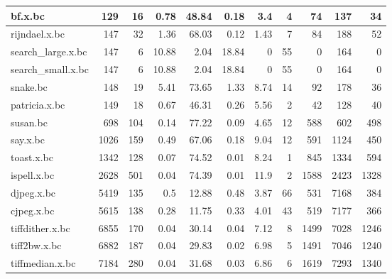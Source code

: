 \begin{tabular}{|l|r|r|r|r|r|r|r|r|r|r|}
\hline
 bf.x.bc              &      129 &   16 &   0.78 &    48.84 &   0.18 &     3.4  &     4 &      74 &        137 &        34 \\
\hline
 rijndael.x.bc        &      147 &   32 &   1.36 &    68.03 &   0.12 &     1.43 &     7 &      84 &        188 &        52 \\
\hline
 search\_large.x.bc    &      147 &    6 &  10.88 &     2.04 &  18.84 &     0    &    55 &       0 &        164 &         0 \\
\hline
 search\_small.x.bc    &      147 &    6 &  10.88 &     2.04 &  18.84 &     0    &    55 &       0 &        164 &         0 \\
\hline
 snake.bc             &      148 &   19 &   5.41 &    73.65 &   1.33 &     8.74 &    14 &      92 &        178 &        36 \\
\hline
 patricia.x.bc        &      149 &   18 &   0.67 &    46.31 &   0.26 &     5.56 &     2 &      42 &        128 &        40 \\
\hline
 susan.bc             &      698 &  104 &   0.14 &    77.22 &   0.09 &     4.65 &    12 &     588 &        602 &       498 \\
\hline
 say.x.bc             &     1026 &  159 &   0.49 &    67.06 &   0.18 &     9.04 &    12 &     591 &       1124 &       450 \\
\hline
 toast.x.bc           &     1342 &  128 &   0.07 &    74.52 &   0.01 &     8.24 &     1 &     845 &       1334 &       594 \\
\hline
 ispell.x.bc          &     2628 &  501 &   0.04 &    74.39 &   0.01 &    11.9  &     2 &    1588 &       2423 &      1328 \\
\hline
 djpeg.x.bc           &     5419 &  135 &   0.5  &    12.88 &   0.48 &     3.87 &    66 &     531 &       7168 &       384 \\
\hline
 cjpeg.x.bc           &     5615 &  138 &   0.28 &    11.75 &   0.33 &     4.01 &    43 &     519 &       7177 &       366 \\
\hline
 tiffdither.x.bc      &     6855 &  170 &   0.04 &    30.14 &   0.04 &     7.12 &     8 &    1499 &       7028 &      1246 \\
\hline
 tiff2bw.x.bc         &     6882 &  187 &   0.04 &    29.83 &   0.02 &     6.98 &     5 &    1491 &       7046 &      1240 \\
\hline
 tiffmedian.x.bc      &     7184 &  280 &   0.04 &    31.68 &   0.03 &     6.86 &     6 &    1619 &       7293 &      1340 \\
\hline
\end{tabular}
